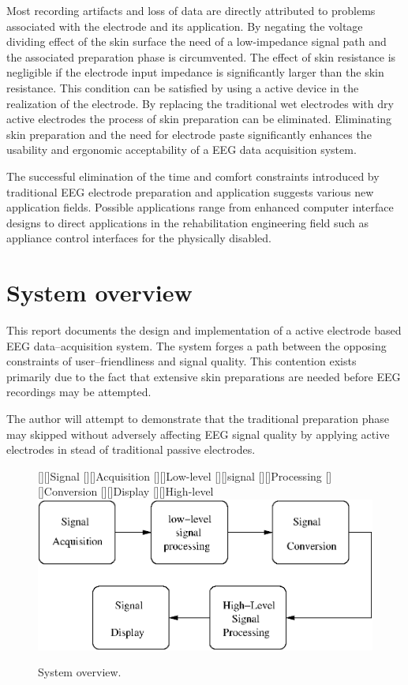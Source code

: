 Most recording artifacts and loss of data are directly attributed to
problems associated with the electrode and its application. By
negating the voltage dividing effect of the skin surface the need of a
low-impedance signal path and the associated preparation phase is
circumvented. The effect of skin resistance is negligible if the
electrode input impedance is significantly larger than the skin
resistance. This condition can be satisfied by using a active device
in the realization of the electrode. By replacing the traditional wet
electrodes with dry active electrodes the process of skin preparation
can be eliminated. Eliminating skin preparation and the need for
electrode paste significantly enhances the usability and ergonomic
acceptability of a EEG data acquisition system.


The successful elimination of the time and comfort constraints
introduced by traditional EEG electrode preparation and application
suggests various new application fields. Possible applications range
from enhanced computer interface designs to direct applications in the
rehabilitation engineering field such as appliance control interfaces
for the physically disabled.


\section{System overview}
This report documents the design and implementation of a active
electrode based EEG data--acquisition system. The system forges a path
between the opposing constraints of user--friendliness and signal
quality. This contention exists primarily due to the fact that
extensive skin preparations are needed before EEG recordings may be
attempted.

The author will attempt to demonstrate that the traditional
preparation phase may skipped without adversely affecting EEG signal
quality by applying active electrodes in stead of traditional passive
electrodes.


\begin{figure}[h]
		[][]{Signal}
		[][]{Acquisition}
		[][]{Low-level}
		[][]{signal}
		[][]{Processing}
		[][]{Conversion}
		[][]{Display}
		[][]{High-level}
        \includegraphics[width=\textwidth]{overview.eps} 
        \caption{System overview.}
        \label{fig:overview}
\end{figure}

